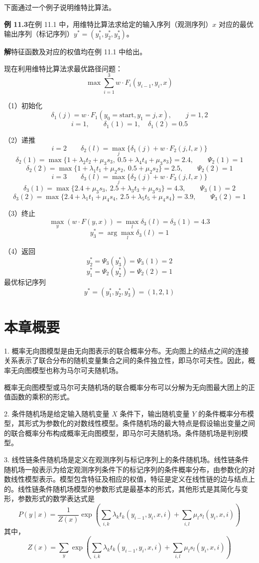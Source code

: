 \documentclass[UTF8, 12pt, fontset=fandol, oneside]{ctexart}
\begin{document}
下面通过一个例子说明维特比算法。

\noindent\textbf{例 11.3}\quad 在例 11.1 中，用维特比算法求给定的输入序列（观测序列）$x$ 对应的最优输出序列（标记序列）$y^*=(y_1^*,y_2^*,y_3^*)$。

\noindent\textbf{解}\quad 特征函数及对应的权值均在例 11.1 中给出。

现在利用维特比算法求最优路径问题：
\[
\max\sum_{i=1}^{3}w\cdot F_i(y_{i-1},y_i,x)
\]

（1）初始化
\[
\delta_1(j)=w\cdot F_1(y_0=\mathrm{start},y_1=j,x),\qquad j=1,2
\]
\[
i=1,\qquad \delta_1(1)=1,\quad \delta_1(2)=0.5
\]

（2）递推
\[
i=2\qquad \delta_2(l)=\max_j\{\delta_1(j)+w\cdot F_2(j,l,x)\}
\]
\[
\delta_2(1)=\max\{1+\lambda_2t_2+\mu_3s_3,\ 0.5+\lambda_4t_4+\mu_3s_3\}=2.4,\qquad \Psi_2(1)=1
\]
\[
\delta_2(2)=\max\{1+\lambda_1t_1+\mu_2s_2,\ 0.5+\mu_2s_2\}=2.5,\qquad \Psi_2(2)=1
\]
\[
i=3\qquad \delta_3(l)=\max_j\{\delta_2(j)+w\cdot F_3(j,l,x)\}
\]
\[
\delta_3(1)=\max\{2.4+\mu_3s_3,\ 2.5+\lambda_3t_3+\mu_3s_3\}=4.3,\qquad \Psi_3(1)=2
\]
\[
\delta_3(2)=\max\{2.4+\lambda_1t_1+\mu_4s_4,\ 2.5+\lambda_5t_5+\mu_4s_4\}=3.9,\qquad \Psi_3(2)=1
\]

（3）终止
\[
\max_y(w\cdot F(y,x))=\max_l\delta_3(l)=\delta_3(1)=4.3
\]
\[
y_3^*=\arg\max_l\delta_3(l)=1
\]

（4）返回
\[
y_2^*=\Psi_3(y_3^*)=\Psi_3(1)=2
\]
\[
y_1^*=\Psi_2(y_2^*)=\Psi_2(2)=1
\]
最优标记序列
\[
y^*=(y_1^*,y_2^*,y_3^*)=(1,2,1)
\]

\section*{本章概要}

1. 概率无向图模型是由无向图表示的联合概率分布。无向图上的结点之间的连接关系表示了联合分布的随机变量集合之间的条件独立性，即马尔可夫性。因此，概率无向图模型也称为马尔可夫随机场。

概率无向图模型或马尔可夫随机场的联合概率分布可以分解为无向图最大团上的正值函数的乘积的形式。

2. 条件随机场是给定输入随机变量 $X$ 条件下，输出随机变量 $Y$ 的条件概率分布模型，其形式为参数化的对数线性模型。条件随机场的最大特点是假设输出变量之间的联合概率分布构成概率无向图模型，即马尔可夫随机场。条件随机场是判别模型。

3. 线性链条件随机场是定义在观测序列与标记序列上的条件随机场。线性链条件随机场一般表示为给定观测序列条件下的标记序列的条件概率分布，由参数化的对数线性模型表示。模型包含特征及相应的权值，特征是定义在线性链的边与结点上的。线性链条件随机场模型的参数形式是最基本的形式，其他形式是其简化与变形，参数形式的数学表达式是
\[
P(y\mid x)=\frac{1}{Z(x)}\exp\left(
\sum_{i,k}\lambda_kt_k(y_{i-1},y_i,x,i)+
\sum_{i,l}\mu_ls_l(y_i,x,i)
\right)
\]
其中，
\[
Z(x)=\sum_y\exp\left(
\sum_{i,k}\lambda_kt_k(y_{i-1},y_i,x,i)+
\sum_{i,l}\mu_ls_l(y_i,x,i)
\right)
\]
\end{document}
